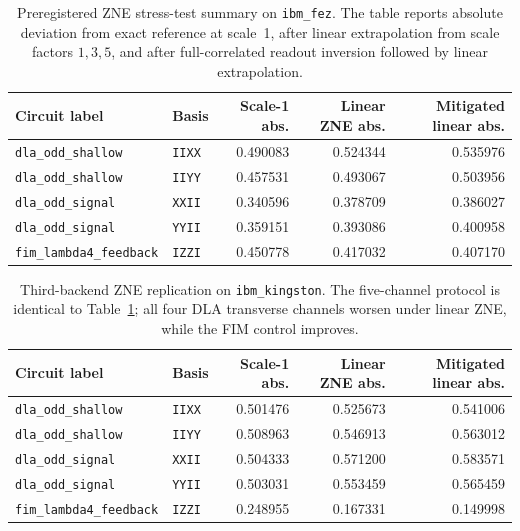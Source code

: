 \documentclass[preprint,aps,physrev,superscriptaddress,floatfix,longbibliography]{revtex4-2}
\begin{document}
\begin{table}[tb]
\centering
\small
\begin{tabular}{llrrr}
\toprule
Circuit label & Basis & Scale-1 abs. & Linear ZNE abs. & Mitigated linear abs. \\
\midrule
\texttt{dla\_odd\_shallow} & \texttt{IIXX} & 0.490083 & 0.524344 & 0.535976 \\
\texttt{dla\_odd\_shallow} & \texttt{IIYY} & 0.457531 & 0.493067 & 0.503956 \\
\texttt{dla\_odd\_signal} & \texttt{XXII} & 0.340596 & 0.378709 & 0.386027 \\
\texttt{dla\_odd\_signal} & \texttt{YYII} & 0.359151 & 0.393086 & 0.400958 \\
\texttt{fim\_lambda4\_feedback} & \texttt{IZZI} & 0.450778 & 0.417032 & 0.407170 \\
\bottomrule
\end{tabular}
\caption{Preregistered ZNE stress-test summary on \texttt{ibm\_fez}. The
table reports absolute deviation from exact reference at scale~1, after
linear extrapolation from scale factors $1,3,5$, and after full-correlated
readout inversion followed by linear extrapolation.}
\label{tab:zne}
\end{table}

\begin{table}[tb]
\centering
\small
\begin{tabular}{llrrr}
\toprule
Circuit label & Basis & Scale-1 abs. & Linear ZNE abs. & Mitigated linear abs. \\
\midrule
\texttt{dla\_odd\_shallow} & \texttt{IIXX} & 0.501476 & 0.525673 & 0.541006 \\
\texttt{dla\_odd\_shallow} & \texttt{IIYY} & 0.508963 & 0.546913 & 0.563012 \\
\texttt{dla\_odd\_signal} & \texttt{XXII} & 0.504333 & 0.571200 & 0.583571 \\
\texttt{dla\_odd\_signal} & \texttt{YYII} & 0.503031 & 0.553459 & 0.565459 \\
\texttt{fim\_lambda4\_feedback} & \texttt{IZZI} & 0.248955 & 0.167331 & 0.149998 \\
\bottomrule
\end{tabular}
\caption{Third-backend ZNE replication on \texttt{ibm\_kingston}. The
five-channel protocol is identical to Table~\ref{tab:zne}; all four DLA
transverse channels worsen under linear ZNE, while the FIM control improves.}
\label{tab:zne-kingston}
\end{table}
\end{document}
